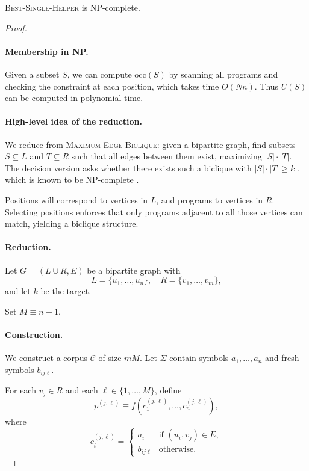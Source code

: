 \begin{proposition}
\textsc{Best-Single-Helper} is NP-complete.
\end{proposition}

\begin{proof}

\par\noindent
\paragraph{Membership in NP.}
Given a subset $S$, we can compute $\mathrm{occ}(S)$ by scanning all programs
and checking the constraint at each position, which takes time $O(Nn)$.
Thus $U(S)$ can be computed in polynomial time.

\par\noindent
\paragraph{High-level idea of the reduction.}
We reduce from \textsc{Maximum-Edge-Biclique}: given a bipartite graph,
find subsets $S \subseteq L$ and $T \subseteq R$ such that all edges between
them exist, maximizing $|S|\cdot |T|$. The decision version asks whether
there exists such a biclique with $|S|\cdot|T| \ge k$ , which is known to be NP-complete \citep{peeters2003maximum}.

Positions will correspond to vertices in $L$, and programs to vertices in $R$.
Selecting positions enforces that only programs adjacent to all those vertices
can match, yielding a biclique structure.

\par\noindent
\paragraph{Reduction.}
Let $G = (L \cup R, E)$ be a bipartite graph with
\[
L = \{u_1, \dots, u_n\}, \quad R = \{v_1, \dots, v_m\},
\]
and let $k$ be the target.

Set $M \equiv n + 1$.

\par\noindent
\paragraph{Construction.}
We construct a corpus $\mathcal C$ of size $mM$.
Let $\Sigma$ contain symbols $a_1, \dots, a_n$ and fresh symbols
$b_{ij\ell}$.

For each $v_j \in R$ and each $\ell \in \{1,\dots,M\}$, define
\[
p^{(j,\ell)} \equiv f(c_1^{(j,\ell)}, \dots, c_n^{(j,\ell)}),
\]
where
\[
c_i^{(j,\ell)} =
\begin{cases}
a_i & \text{if } (u_i, v_j) \in E, \\
b_{ij\ell} & \text{otherwise}.
\end{cases}
\]


\end{proof}
